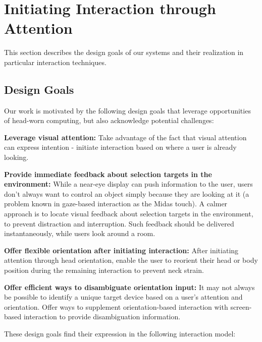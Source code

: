 \section{Initiating Interaction through Attention}
This section describes the design goals of our systems and their realization in particular interaction techniques.

\subsection{Design Goals}
Our work is motivated by the following design goals that leverage opportunities of head-worn computing, but also acknowledge potential challenges:

{\bf Leverage visual attention:} Take advantage of the fact that visual attention can express intention - initiate interaction based on where a user is already looking. 

{\bf Provide immediate feedback about selection targets in the environment:} While a near-eye display can push information to the user, users don't always want to control an object simply because they are looking at it (a problem known in gaze-based interaction as the Midas touch). A calmer~\cite{weiser_coming_1997} approach is to locate visual feedback about selection targets in the environment, to prevent distraction and interruption. Such feedback should be delivered instantaneously, while users look around a room.

{\bf Offer flexible orientation after initiating interaction:} After initiating attention through head orientation, enable the user to reorient their head or body position during the remaining interaction to prevent neck strain.

{\bf Offer efficient ways to disambiguate orientation input:} It may not always be possible to identify a unique target device based on a user's attention and orientation. Offer ways to supplement orientation-based interaction with screen-based interaction to provide disambiguation information.

These design goals find their expression in the following interaction model:

